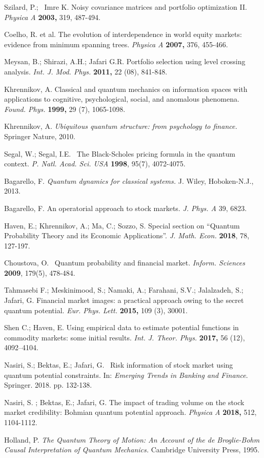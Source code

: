 \documentclass[ aip,jmp,reprint]{revtex4-2}
\begin{document}
\begin{thebibliography}{99}
 Szilard, P.; \ Imre K. Noisy covariance matrices and
portfolio optimization II. \textit{Physica A} \textbf{2003, }319, 487-494.

 Coelho, R. et al. The evolution of interdependence in world
equity markets: evidence from minimum spanning trees. \textit{Physica A} 
\textbf{2007, }376, 455-466.

 Meysan, B.; Shirazi, A.H.;  Jafari G.R. Portfolio
selection using level crossing analysis. \textit{Int. J. Mod. Phys.} \textbf{%
2011, }22 (08), 841-848.

 Khrennikov, A. Classical and quantum mechanics on
information spaces with applications to cognitive, psychological, social,
and anomalous phenomena. \textit{Found. Phys.} \textbf{1999, }29 (7),
1065-1098.

 Khrennikov, A. \textit{Ubiquitous quantum structure:
from psychology to finance.} Springer Nature, 2010.

 Segal, W.; Segal, I.E. \ The Black-Scholes pricing formula
in the quantum context. \textit{P. Natl. Acad. Sci. USA} \textbf{1998},
95(7), 4072-4075.

 Bagarello, F. \textit{Quantum dynamics for classical
systems.} J. Wiley, Hoboken-N.J., 2013.

 Bagarello, F. An operatorial approach to stock
markets. \textit{J. Phys. A} 39, 6823.

 Haven, E.; Khrennikov, A.; Ma, C.; Sozzo, S. Special section
on \textquotedblleft Quantum Probability Theory and its Economic
Applications\textquotedblright . \textit{J. Math. Econ. }\textbf{2018}, 78,
127-197.

 Choustova, O. \ Quantum probability and financial
market. \textit{Inform. Sciences }\textbf{2009}, 179(5), 478-484.

 Tahmasebi F.; Meskinimood, S.; Namaki, A.; Farahani,
S.V.; Jalalzadeh, S.; Jafari, G. Financial market images: a practical
approach owing to the secret quantum potential. \textit{Eur. Phys. Lett.} 
\textbf{2015, }109 (3), 30001.

 Shen C.; Haven, E. Using empirical data to estimate potential
functions in commodity markets: some initial results. \textit{Int. J. Theor.
Phys. } \textbf{2017, }56 (12), 4092--4104.

 Nasiri, S.; Bektas, E.; Jafari, G. \ Risk information of
stock market using quantum potential constraints. In: \textit{Emerging
Trends in Banking and Finance}. Springer. 2018. pp. 132-138.

 Nasiri, S. ; Bektas, E.; Jafari, G. The impact of trading
volume on the stock market credibility: Bohmian quantum potential approach. 
\textit{Physica A} \textbf{2018, }512, 1104-1112.

 Holland, P. \textit{The Quantum Theory of Motion: An
Account of the de Broglie-Bohm Causal Interpretation of Quantum Mechanics.}
Cambridge University Press, 1995. 
\end{thebibliography}
\end{document}
